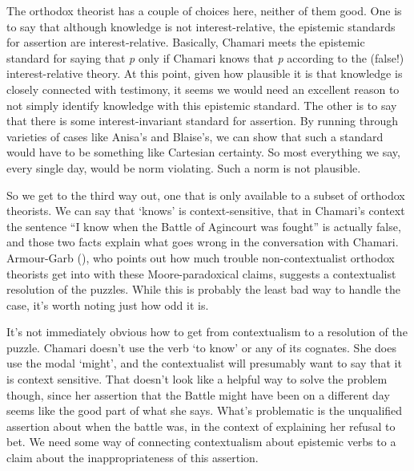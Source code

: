 \documentclass[
  10pt,
  letterpaper,
  twoside]{scrbook}
\begin{document}
The orthodox theorist has a couple of choices here, neither of them
good. One is to say that although knowledge is not interest-relative,
the epistemic standards for assertion are interest-relative. Basically,
Chamari meets the epistemic standard for saying that \emph{p} only if
Chamari knows that \emph{p} according to the (false!) interest-relative
theory. At this point, given how plausible it is that knowledge is
closely connected with testimony, it seems we would need an excellent
reason to not simply identify knowledge with this epistemic standard.
The other is to say that there is some interest-invariant standard for
assertion. By running through varieties of cases like Anisa's and
Blaise's, we can show that such a standard would have to be something
like Cartesian certainty. So most everything we say, every single day,
would be norm violating. Such a norm is not plausible.

So we get to the third way out, one that is only available to a subset
of orthodox theorists. We can say that `knows' is context-sensitive,
that in Chamari's context the sentence ``I know when the Battle of
Agincourt was fought'' is actually false, and those two facts explain
what goes wrong in the conversation with Chamari. Armour-Garb
(), who points out how much trouble
non-contextualist orthodox theorists get into with these
Moore-paradoxical claims, suggests a contextualist resolution of the
puzzles. While this is probably the least bad way to handle the case,
it's worth noting just how odd it is.

It's not immediately obvious how to get from contextualism to a
resolution of the puzzle. Chamari doesn't use the verb `to know' or any
of its cognates. She does use the modal `might', and the contextualist
will presumably want to say that it is context sensitive. That doesn't
look like a helpful way to solve the problem though, since her assertion
that the Battle might have been on a different day seems like the good
part of what she says. What's problematic is the unqualified assertion
about when the battle was, in the context of explaining her refusal to
bet. We need some way of connecting contextualism about epistemic verbs
to a claim about the inappropriateness of this assertion.
\end{document}
